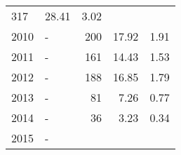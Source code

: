 \begin{longtable}{lXrrr}
       \num{317} &
       \num[round-mode=places,round-precision=2]{28,41} &
         \num[round-mode=places,round-precision=2]{3,02} \\

     2010 &
     \multicolumn{1}{X}{ -  } &


       \num{200} &
       \num[round-mode=places,round-precision=2]{17,92} &
         \num[round-mode=places,round-precision=2]{1,91} \\

     2011 &
     \multicolumn{1}{X}{ -  } &


       \num{161} &
       \num[round-mode=places,round-precision=2]{14,43} &
         \num[round-mode=places,round-precision=2]{1,53} \\

     2012 &
     \multicolumn{1}{X}{ -  } &


       \num{188} &
       \num[round-mode=places,round-precision=2]{16,85} &
         \num[round-mode=places,round-precision=2]{1,79} \\

     2013 &
     \multicolumn{1}{X}{ -  } &


       \num{81} &
       \num[round-mode=places,round-precision=2]{7,26} &
         \num[round-mode=places,round-precision=2]{0,77} \\

     2014 &
     \multicolumn{1}{X}{ -  } &


       \num{36} &
       \num[round-mode=places,round-precision=2]{3,23} &
         \num[round-mode=places,round-precision=2]{0,34} \\

     2015 &
     \multicolumn{1}{X}{ -  } &



\end{longtable}
